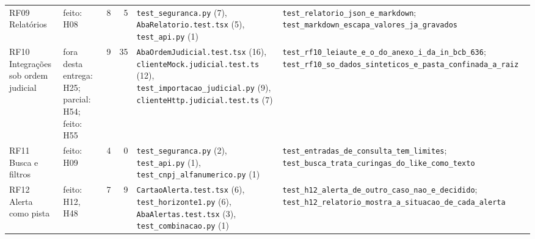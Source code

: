 \begin{scriptsize}
\begin{longtable}{>{\raggedright\arraybackslash}p{2.5cm}>{\raggedright\arraybackslash}p{1.9cm}rr>{\raggedright\arraybackslash}p{3.3cm}>{\raggedright\arraybackslash}p{4.5cm}}
RF09 Relatórios & feito: H08 & 8 & 5 & \texttt{test\_\allowbreak{}seguranca.\allowbreak{}py} (7), \texttt{AbaRelatorio.\allowbreak{}test.\allowbreak{}tsx} (5), \texttt{test\_\allowbreak{}api.\allowbreak{}py} (1) & \texttt{test\_\allowbreak{}relatorio\_\allowbreak{}json\_\allowbreak{}e\_\allowbreak{}markdown}; \texttt{test\_\allowbreak{}markdown\_\allowbreak{}escapa\_\allowbreak{}valores\_\allowbreak{}ja\_\allowbreak{}gravados} \\
RF10 Integrações sob ordem judicial & fora desta entrega: H25; parcial: H54; feito: H55 & 9 & 35 & \texttt{AbaOrdemJudicial.\allowbreak{}test.\allowbreak{}tsx} (16), \texttt{clienteMock.\allowbreak{}judicial.\allowbreak{}test.\allowbreak{}ts} (12), \texttt{test\_\allowbreak{}importacao\_\allowbreak{}judicial.\allowbreak{}py} (9), \texttt{clienteHttp.\allowbreak{}judicial.\allowbreak{}test.\allowbreak{}ts} (7) & \texttt{test\_\allowbreak{}rf10\_\allowbreak{}leiaute\_\allowbreak{}e\_\allowbreak{}o\_\allowbreak{}do\_\allowbreak{}anexo\_\allowbreak{}i\_\allowbreak{}da\_\allowbreak{}in\_\allowbreak{}bcb\_\allowbreak{}636}; \texttt{test\_\allowbreak{}rf10\_\allowbreak{}so\_\allowbreak{}dados\_\allowbreak{}sinteticos\_\allowbreak{}e\_\allowbreak{}pasta\_\allowbreak{}confinada\_\allowbreak{}a\_\allowbreak{}raiz} \\
RF11 Busca e filtros & feito: H09 & 4 & 0 & \texttt{test\_\allowbreak{}seguranca.\allowbreak{}py} (2), \texttt{test\_\allowbreak{}api.\allowbreak{}py} (1), \texttt{test\_\allowbreak{}cnpj\_\allowbreak{}alfanumerico.\allowbreak{}py} (1) & \texttt{test\_\allowbreak{}entradas\_\allowbreak{}de\_\allowbreak{}consulta\_\allowbreak{}tem\_\allowbreak{}limites}; \texttt{test\_\allowbreak{}busca\_\allowbreak{}trata\_\allowbreak{}curingas\_\allowbreak{}do\_\allowbreak{}like\_\allowbreak{}como\_\allowbreak{}texto} \\
RF12 Alerta como pista & feito: H12, H48 & 7 & 9 & \texttt{CartaoAlerta.\allowbreak{}test.\allowbreak{}tsx} (6), \texttt{test\_\allowbreak{}horizonte1.\allowbreak{}py} (6), \texttt{AbaAlertas.\allowbreak{}test.\allowbreak{}tsx} (3), \texttt{test\_\allowbreak{}combinacao.\allowbreak{}py} (1) & \texttt{test\_\allowbreak{}h12\_\allowbreak{}alerta\_\allowbreak{}de\_\allowbreak{}outro\_\allowbreak{}caso\_\allowbreak{}nao\_\allowbreak{}e\_\allowbreak{}decidido}; \texttt{test\_\allowbreak{}h12\_\allowbreak{}relatorio\_\allowbreak{}mostra\_\allowbreak{}a\_\allowbreak{}situacao\_\allowbreak{}de\_\allowbreak{}cada\_\allowbreak{}alerta} \\

\end{longtable}
\end{scriptsize}
